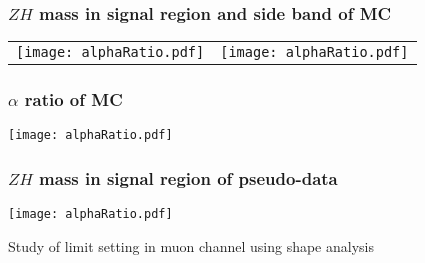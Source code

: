 \documentclass[7pt,aspectratio=1610]{beamer}
\renewcommand{\arraystretch}{1.2}
\begin{document}
\begin{frame}
  \frametitle{$ZH$ mass in signal region and side band of MC}
  \begin{center}
    \begin{tabular}{ll}
      \texttt{[image: alphaRatio.pdf]} &
      \texttt{[image: alphaRatio.pdf]} \\
    \end{tabular}
  \end{center}
\end{frame}
\begin{frame}
  \frametitle{$\alpha$ ratio of MC}
  \begin{center}
    \texttt{[image: alphaRatio.pdf]}
  \end{center}
\end{frame}
\begin{frame}
  \frametitle{$ZH$ mass in signal region of pseudo-data}
  \begin{center}
    \texttt{[image: alphaRatio.pdf]}
  \end{center}
\end{frame}
\begin{frame}
  \Large{\centerline{Study of limit setting in muon channel using shape analysis}}
\end{frame}
\renewcommand{\arraystretch}{1.2}
\end{document}

